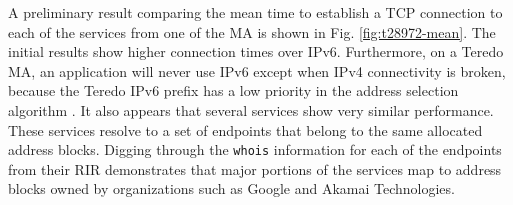 A preliminary result comparing the mean time to establish a TCP connection to
each of the services from one of the \ac{MA} is shown in Fig.
\ref{fig:t28972-mean}. The initial results show higher connection times over
IPv6. Furthermore, on a Teredo \ac{MA}, an application will never use IPv6
except when IPv4 connectivity is broken, because the Teredo IPv6 prefix has a
low priority in the address selection algorithm \cite{rfc6724}. It also
appears that several services show very similar performance. These services
resolve to a set of endpoints that belong to the same allocated address
blocks. Digging through the \texttt{whois} information for each of the
endpoints from their \ac{RIR} demonstrates that major portions of the services
map to address blocks owned by organizations such as Google and Akamai
Technologies.
